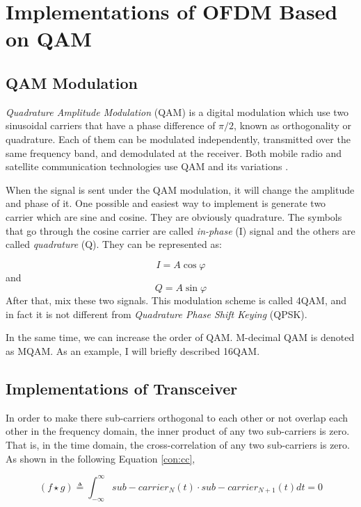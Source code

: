 \documentclass{article}
\numberwithin{figure}{section}
\begin{document}
\section{Implementations of OFDM Based on QAM}

\subsection{QAM Modulation}
\textit{Quadrature Amplitude Modulation} (QAM) is a digital modulation which use two sinusoidal carriers that have a phase difference of ${\pi}/{2}$, known as orthogonality or quadrature. Each of them can be modulated independently, transmitted over the same frequency band, and demodulated at the receiver. Both mobile radio and satellite communication technologies use QAM and its variations \cite{RN82}.

When the signal is sent under the QAM modulation, it will change the amplitude and phase of it. One possible and easiest way to implement is generate two carrier which are sine and cosine. They are obviously quadrature. The symbols that go through the cosine carrier are called \textit{in-phase} (I) signal and the others are called \textit{quadrature} (Q). They can be represented as: 

\begin{equation}
I = A\cos{\varphi} \label{con:i signal}
\end{equation}
and
\begin{equation}
Q = A\sin{\varphi} \label{con:q signal}
\end{equation}
After that, mix these two signals. This modulation scheme is called 4QAM, and in fact it is not different from \textit{Quadrature Phase Shift Keying} (QPSK).

In the same time, we can increase the order of QAM. M-decimal QAM is denoted as MQAM. As an example, I will briefly described 16QAM.

\subsection{Implementations of Transceiver}

In order to make there sub-carriers orthogonal to each other or not overlap each other in the frequency domain, the inner product of any two sub-carriers is zero. That is, in the time domain, the cross-correlation of any two sub-carriers is zero. As shown in the following Equation \ref{con:cc},

\begin{equation}
(f \star g) \triangleq \int_{-\infty}^{\infty} sub-carrier_N(t) \cdot sub-carrier_{N+1}(t)dt=0 \label{con:cc}
\end{equation}
\end{document}

